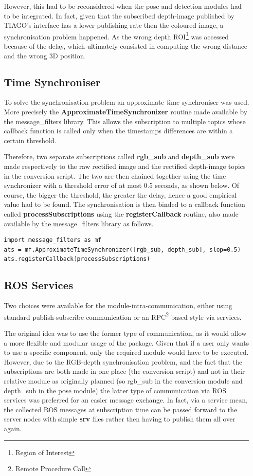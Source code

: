 However, this had to be reconsidered when the pose and detection modules had to be integrated. In fact, given that the subscribed depth-image published by TIAGO's interface has a lower publishing rate then the coloured image, a synchronisation problem happened. As the wrong depth ROI\footnote{Region of Interest} was accessed because of the delay, which ultimately consisted in computing the wrong distance and the wrong 3D position.

\subsection{Time Synchroniser}

To solve the synchronisation problem an approximate time synchroniser was used. More precisely the \textbf{ApproximateTimeSynchronizer} routine made available by the message\_filters library. This allows the subscription to multiple topics whose callback function is called only when the timestamps differences are within a certain threshold.

Therefore, two separate subscriptions called \textbf{rgb\_sub} and \textbf{depth\_sub} were made respectively to the raw rectified image and the rectified depth-image topics in the conversion script. The two are then chained together using the time synchronizer with a threshold error of at most 0.5 seconds, as shown below. Of course, the bigger the threshold, the greater the delay, hence a good empirical value had to be found. The synchronisation is then binded to a callback function called \textbf{processSubscriptions} using the \textbf{registerCallback} routine, also made available by the message\_filters library as follows.

\begin{lstlisting}
import message_filters as mf
ats = mf.ApproximateTimeSynchronizer([rgb_sub, depth_sub], slop=0.5)
ats.registerCallback(processSubscriptions)
\end{lstlisting}

\subsection{ROS Services}

Two choices were available for the module-intra-communication, either using standard publish-subscribe communication or an RPC\footnote{Remote Procedure Call} based style via services. 

The original idea was to use the former type of communication, as it would allow a more flexible and modular usage of the package. Given that if a user only wants to use a specific component, only the required module would have to be executed. However, due to the RGB-depth synchronisation problem, and the fact that the subscriptions are both made in one place (the conversion script) and not in their relative module as originally planned (so rgb\_sub in the conversion module and depth\_sub in the pose module) the latter type of communication via ROS services was preferred for an easier message exchange. In fact, via a service mean, the collected ROS messages at subscription time can be passed forward to the server nodes with simple \textbf{srv} files rather then having to publish them all over again.

